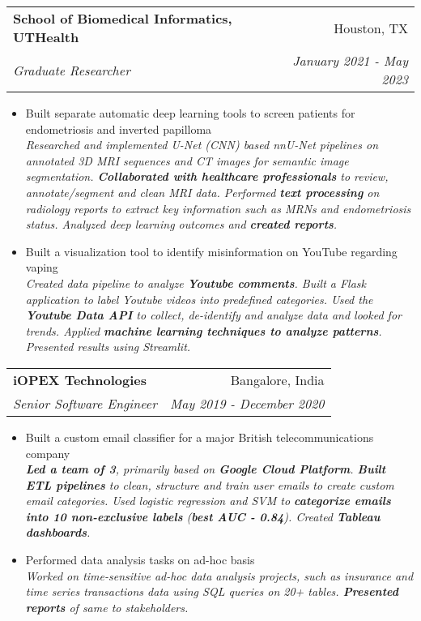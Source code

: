 \documentclass[a4paper,10.8pt]{article}
\makeatletter
\newcommand{\resumeSubheading}[4]{
  \vspace{-1pt}\item
    \begin{tabular*}{0.97\textwidth}{l@{\extracolsep{\fill}}r}
      \textbf{#1} & #2 \\
      \textit{\small#3} & \textit{\small #4} \\
    \end{tabular*}\vspace{-5pt}
}
\makeatother
\begin{document}
    \resumeSubheading
    {School of Biomedical Informatics, UTHealth}{Houston, TX}
    {Graduate Researcher}{January 2021 - May 2023}
    \begin{itemize}
        \item Built separate automatic deep learning tools to screen patients for endometriosis and inverted papilloma\\
            \textit{
            Researched and implemented U-Net (CNN) based nnU-Net pipelines on annotated 3D MRI sequences and CT images for semantic image segmentation.
            \textbf{Collaborated with healthcare professionals} to review, annotate/segment and clean MRI data. 
            Performed \textbf{text processing} on radiology reports to extract key information such as MRNs and endometriosis status.
            Analyzed deep learning outcomes and \textbf{created reports}.
            }
        \item Built a visualization tool to identify misinformation on YouTube regarding vaping\\
            \textit{
            Created data pipeline to analyze \textbf{Youtube comments}.
            Built a Flask application to label Youtube videos into predefined categories.
            Used the \textbf{Youtube Data API} to collect, de-identify and analyze data and looked for trends.
            Applied \textbf{machine learning techniques to analyze patterns}. Presented results using Streamlit. 
            }
      \end{itemize}

    \resumeSubheading
    {iOPEX Technologies}{Bangalore, India}
    {Senior Software Engineer}{May 2019 - December 2020}
    \begin{itemize}
      \item Built a custom email classifier for a major British telecommunications company\\
      \textit{\textbf{Led a team of 3}, primarily based on \textbf{Google Cloud Platform}.
      \textbf{Built ETL pipelines} to clean, structure and train user emails to create custom email categories.
      Used logistic regression and SVM to \textbf{categorize emails into 10 non-exclusive labels} (\textbf{best AUC - 0.84}).
      Created \textbf{Tableau dashboards}.
      }
      \item Performed data analysis tasks on ad-hoc basis\\
      \textit{Worked on time-sensitive ad-hoc data analysis projects, such as insurance and time series transactions data using SQL queries on 20+ tables.
        \textbf{Presented reports} of same to stakeholders.
      }
      
    \end{itemize}
      
\end{document}
